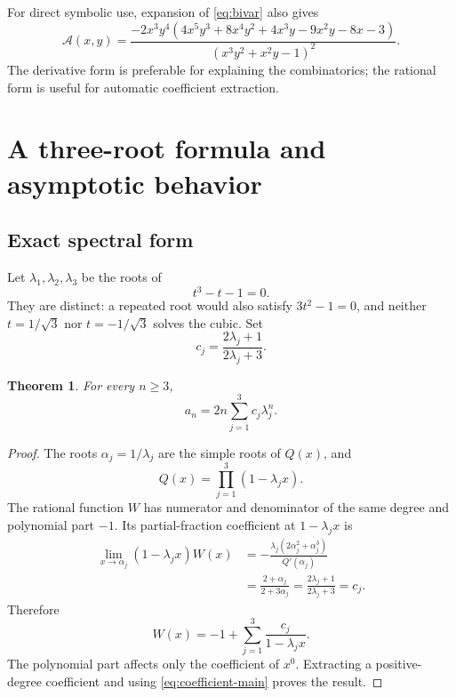 \documentclass[11pt,letterpaper]{article}
\numberwithin{equation}{section}
\newtheorem{theorem}{Theorem}[section]
\theoremstyle{definition}
\theoremstyle{remark}
\newcommand{\A}{\mathcal A}
\begin{document}
For direct symbolic use, expansion of \eqref{eq:bivar} also gives
\begin{equation}\label{eq:bivarexpanded}
 \A(x,y)=
 \frac{-2x^3y^4(4x^5y^3+8x^4y^2+4x^3y-9x^2y-8x-3)}
 {(x^3y^2+x^2y-1)^2}.
\end{equation}
The derivative form is preferable for explaining the combinatorics;
the rational form is useful for automatic coefficient extraction.

\section{A three-root formula and asymptotic behavior}\label{sec:asymptotic}

\subsection{Exact spectral form}
Let $\lambda_1,\lambda_2,\lambda_3$ be the roots of
\begin{equation}\label{eq:cubic}
 t^3-t-1=0.
\end{equation}
They are distinct: a repeated root would also satisfy $3t^2-1=0$,
and neither $t=1/\sqrt3$ nor $t=-1/\sqrt3$ solves the cubic.
Set
\begin{equation}\label{eq:cj}
 c_j=\frac{2\lambda_j+1}{2\lambda_j+3}.
\end{equation}

\begin{theorem}\label{thm:binet}
For every $n\ge3$,
\begin{equation}\label{eq:binet}
 \boxed{\displaystyle
 a_n=2n\sum_{j=1}^3c_j\lambda_j^n.}
\end{equation}
\end{theorem}
\begin{proof}
The roots $\alpha_j=1/\lambda_j$ are the simple roots of $Q(x)$,
and
\[
 Q(x)=\prod_{j=1}^3(1-\lambda_jx).
\]
The rational function $W$ has numerator and denominator of the same
degree and polynomial part $-1$. Its partial-fraction coefficient
at $1-\lambda_jx$ is
\begin{align*}
 \lim_{x\to\alpha_j}(1-\lambda_jx)W(x)
 &=-\frac{\lambda_j(2\alpha_j^2+\alpha_j^3)}{Q'(\alpha_j)}\\
 &=\frac{2+\alpha_j}{2+3\alpha_j}
 =\frac{2\lambda_j+1}{2\lambda_j+3}=c_j.
\end{align*}
Therefore
\begin{equation}\label{eq:partial}
 W(x)=-1+\sum_{j=1}^3\frac{c_j}{1-\lambda_jx}.
\end{equation}
The polynomial part affects only the coefficient of $x^0$.
Extracting a positive-degree coefficient and using
\eqref{eq:coefficient-main} proves the result.
\end{proof}
\end{document}
